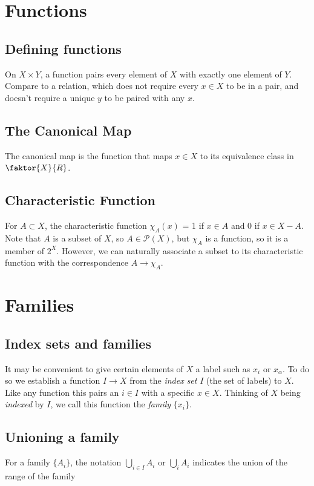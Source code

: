 \documentclass{article}
\newcommand{\pow}[1]{\mathscr{P}(#1)}
\begin{document}
\section{Functions}

\subsection{Defining functions} 

On $X \times Y$, a function pairs every element of $X$ with exactly one element of $Y$. Compare to a relation, which does not require every $x \in X$ to be in a pair, and doesn't require a unique $y$ to be paired with any $x$.

\subsection{The Canonical Map} The canonical map is the function that maps $x \in X$ to its equivalence class in $\faktor{X}{R}$.

\subsection{Characteristic Function} For $A \subset X$, the characteristic function $\chi_A(x)$ = 1 if $x \in A$ and 0 if $x \in X - A$. Note that $A$ is a subset of $X$, so $A \in \pow{X}$, but $\chi_A$ is a function, so it is a member of $2^X$. However, we can naturally associate a subset to its characteristic function with the correspondence $A \longrightarrow \chi_A$.

\section{Families}

\subsection{Index sets and families} It may be convenient to give certain elements of $X$ a label such as $x_i$ or $x_\alpha$. To do so we establish a function $I \longrightarrow X$ from the \textit{index set} $I$ (the set of labels) to $X$. Like any function this pairs an $i \in I$ with a specific $x \in X$. Thinking of $X$ being \textit{indexed} by $I$, we call this function the \textit{family} $\{x_i\}$.

\subsection{Unioning a family} For a family $\{A_i\}$, the notation $\bigcup_{i \in I} A_i$ or $\bigcup_i A_i$ indicates the union of the range of the family
\end{document}
